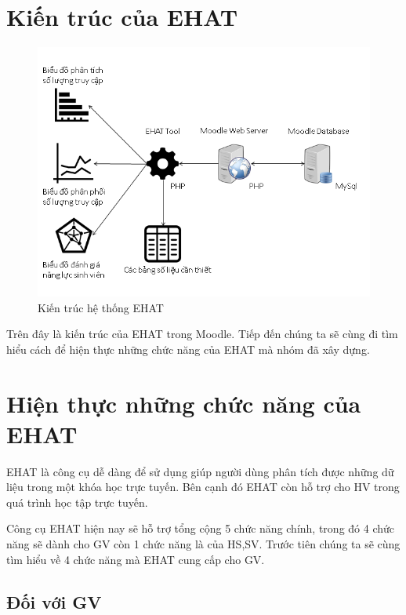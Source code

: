 \newpage
\section{Kiến trúc của EHAT}

\begin{center}
	\begin{figure}[htp]
		\begin{center}
			\includegraphics[scale=1]{img/kientrucehat}
		\end{center}
		\caption{Kiến trúc hệ thống EHAT}
		\label{refhinh21}
	\end{figure}
\end{center}

Trên đây là kiến trúc của EHAT trong Moodle. Tiếp đến chúng ta sẽ cùng đi tìm hiểu cách để hiện thực những chức năng của EHAT mà nhóm đã xây dựng.

\section{Hiện thực những chức năng của EHAT}

EHAT là công cụ dễ dàng để sử dụng giúp người dùng phân tích được những dữ liệu trong một khóa học trực tuyến. Bên cạnh đó EHAT còn hỗ trợ cho HV trong quá trình học tập trực tuyến.

Công cụ EHAT hiện nay sẽ hỗ trợ tổng cộng 5 chức năng chính, trong đó 4 chức năng sẽ dành cho GV còn 1 chức năng là của HS,SV. Trước tiên chúng ta sẽ cùng tìm hiểu về 4 chức năng mà EHAT cung cấp cho GV.

\subsection{Đối với GV}

